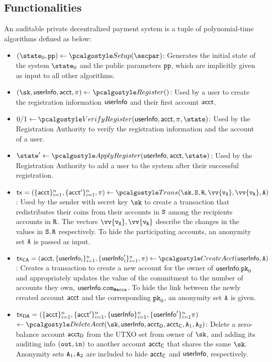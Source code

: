 \subsection{Functionalities}
An auditable private decentralized payment system is a tuple of polynomial-time algorithms defined as below:

\begin{itemize}
    \item $(\instate, \params) \gets \setup(\secpar)$: 
    Generates the initial state of the system $\instate$ and the public parameters $\textup{\texttt{{pp}}}$, which are implicitly given as input to all other algorithms.

    \item $(\sk, \userinfo, \acct, \pi) \gets \reg()$: 
    Used by a user to create the registration information $\textup{\textsf{userInfo}}$ and their first account $\textup{\textsf{acct}}$.

    \item $0/1 \gets \verreg(\userinfo, \acct, \pi, \state)$: 
        Used by the Registration Authority to verify the registration information and the account of a user.

    \item $\state' \gets \applyreg(\userinfo, \acct, \state)$:
        Used by the Registration Authority to add a user to the system after their successful registration.
    
    \item $\txn = (\{\acct\}_{i=1}^n, \{{\acct}'\}_{i=1}^n, \pi) \gets \trans(\sk,\sset, \rset, \vv{\v_\sset}, \vv{\v_\rset}, \anset)$:
    Used by the sender with secret key $\sk$ to create a transaction that redistributes their coins from their accounts in $\mathtt{S}$ among the recipients accounts in $\mathtt{R}$. The vectors $\vv{\v_\sset},\vv{\v_\rset}$ describe the changes in the values in $\mathtt{S}, \mathtt{R}$ respectively. To hide the participating accounts, an anonymity set ${\mathtt{A}}$ is passed as input.

    \item $\txnca = (\acct, \{\userinfo_i\}_{i=1}^n, \{\userinfo_i^\prime\}_{i=1}^n, \pi)\gets \createAcct(\userinfo, \anset)$: 
        Creates a transaction to create a new account for the owner of $\textup{\textsf{userInfo}}.\textup{\texttt{pk}}_{0}$ and appropriately updates the value of the commitment to the number of accounts they own, $\textup{\textsf{userInfo}}.\texttt{com}_{\textup{\texttt{\#accs}}}$.
        To hide the link between the newly created account $\textup{\textsf{acct}}$ and the corresponding $\textup{\texttt{pk}}_{0}$, an anonymity set ${\mathtt{A}}$ is given.

    \item $\textup{\textsf{tx}}_\textsf{DA} = (\{\textup{\textsf{acct}}\}_{i=1}^n, \{{\textup{\textsf{acct}}}'\}_{i=1}^n, \{\textup{\textsf{userInfo}}\}_{i=1}^n, \{{\textup{\textsf{userInfo}}}'\}_{i=1}^n  \pi)$\\ $\gets \deleteAcct(\sk, \userinfo, \accttodelete, \accttotransfer, \anset_1, \anset_2)$: 
        Delete a zero-balance account $\textup{\textsf{acct}}_\textsf{D}$ from the UTXO set from owner of $\sk$, and adding its auditing info $(\textup{\texttt{{out}}}, \textup{\texttt{{in}}})$ to another account $\textup{\textsf{acct}}_\textsf{C}$ that shares the same $\sk$. Anonymity sets ${\mathtt{A}}_1, {\mathtt{A}}_2$ are included to hide $\textup{\textsf{acct}}_\textsf{C}$ and $\textup{\textsf{userInfo}}$, respectively.


\end{itemize}
